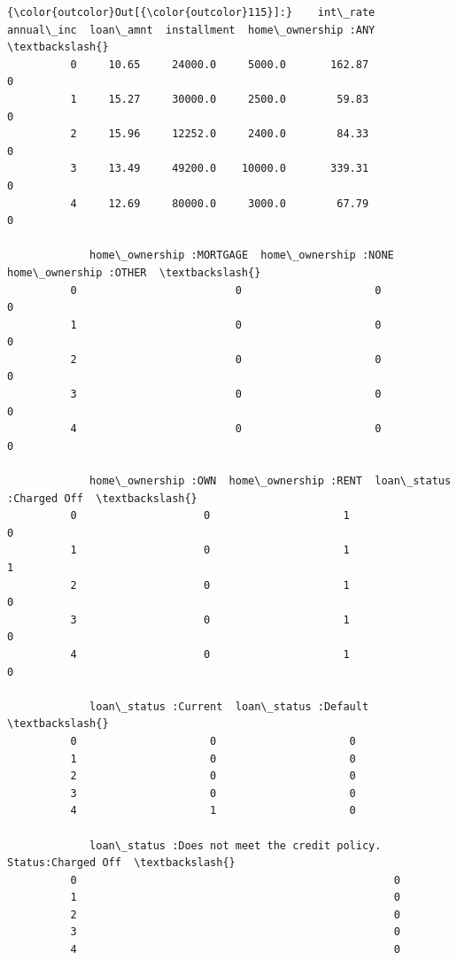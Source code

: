 \documentclass[11pt]{article}
\begin{document}
\begin{Verbatim}[commandchars=\\\{\}]
{\color{outcolor}Out[{\color{outcolor}115}]:}    int\_rate  annual\_inc  loan\_amnt  installment  home\_ownership :ANY  \textbackslash{}
          0     10.65     24000.0     5000.0       162.87                    0   
          1     15.27     30000.0     2500.0        59.83                    0   
          2     15.96     12252.0     2400.0        84.33                    0   
          3     13.49     49200.0    10000.0       339.31                    0   
          4     12.69     80000.0     3000.0        67.79                    0   
          
             home\_ownership :MORTGAGE  home\_ownership :NONE  home\_ownership :OTHER  \textbackslash{}
          0                         0                     0                      0   
          1                         0                     0                      0   
          2                         0                     0                      0   
          3                         0                     0                      0   
          4                         0                     0                      0   
          
             home\_ownership :OWN  home\_ownership :RENT  loan\_status :Charged Off  \textbackslash{}
          0                    0                     1                         0   
          1                    0                     1                         1   
          2                    0                     1                         0   
          3                    0                     1                         0   
          4                    0                     1                         0   
          
             loan\_status :Current  loan\_status :Default  \textbackslash{}
          0                     0                     0   
          1                     0                     0   
          2                     0                     0   
          3                     0                     0   
          4                     1                     0   
          
             loan\_status :Does not meet the credit policy. Status:Charged Off  \textbackslash{}
          0                                                  0                  
          1                                                  0                  
          2                                                  0                  
          3                                                  0                  
          4                                                  0                  
          

\end{Verbatim}
\end{document}
